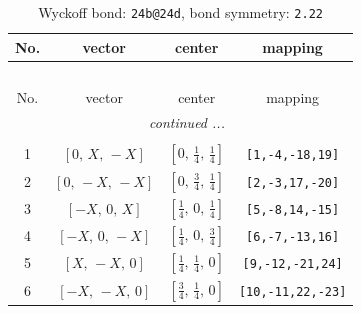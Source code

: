 \documentclass[fleqn,8pt]{jsarticle}
\begin{document}
\renewcommand{\arraystretch}{1.2}
\begin{longtable}{cccc}
\caption{Wyckoff bond: {\tt 24b@24d}, bond symmetry: {\tt 2.22}}
 \\
 \hline \hline
No. & vector & center & mapping \\ \hline \endfirsthead

\multicolumn{3}{l}{\tablename\ \thetable{}} \\
 \hline \hline
No. & vector & center & mapping \\ \hline \endhead

 \hline \hline
\multicolumn{3}{r}{\footnotesize\it continued ...} \\ \endfoot

 \hline \hline
\multicolumn{3}{r}{} \\ \endlastfoot

1 & $\left[ 0,\, X,\, - X \right]$ & $\left[ 0,\, \frac{1}{4},\, \frac{1}{4} \right]$ & {\tt [1,-4,-18,19]} \\ \hline
2 & $\left[ 0,\, - X,\, - X \right]$ & $\left[ 0,\, \frac{3}{4},\, \frac{1}{4} \right]$ & {\tt [2,-3,17,-20]} \\ \hline
3 & $\left[ - X,\, 0,\, X \right]$ & $\left[ \frac{1}{4},\, 0,\, \frac{1}{4} \right]$ & {\tt [5,-8,14,-15]} \\ \hline
4 & $\left[ - X,\, 0,\, - X \right]$ & $\left[ \frac{1}{4},\, 0,\, \frac{3}{4} \right]$ & {\tt [6,-7,-13,16]} \\ \hline
5 & $\left[ X,\, - X,\, 0 \right]$ & $\left[ \frac{1}{4},\, \frac{1}{4},\, 0 \right]$ & {\tt [9,-12,-21,24]} \\ \hline
6 & $\left[ - X,\, - X,\, 0 \right]$ & $\left[ \frac{3}{4},\, \frac{1}{4},\, 0 \right]$ & {\tt [10,-11,22,-23]} \\
\end{longtable}
\renewcommand{\arraystretch}{1.2}
\end{document}
